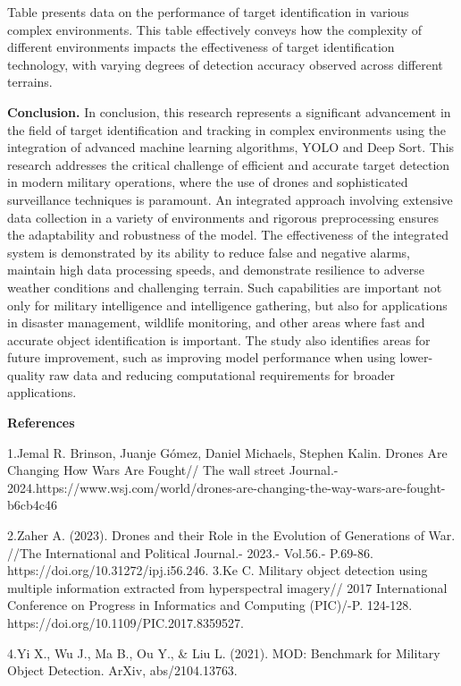Table presents data on the performance of target identification in
various complex environments. This table effectively conveys how the
complexity of different environments impacts the effectiveness of target
identification technology, with varying degrees of detection accuracy
observed across different terrains.

{\bfseries Conclusion.} In conclusion, this research represents a
significant advancement in the field of target identification and
tracking in complex environments using the integration of advanced
machine learning algorithms, YOLO and Deep Sort. This research addresses
the critical challenge of efficient and accurate target detection in
modern military operations, where the use of drones and sophisticated
surveillance techniques is paramount. An integrated approach involving
extensive data collection in a variety of environments and rigorous
preprocessing ensures the adaptability and robustness of the model. The
effectiveness of the integrated system is demonstrated by its ability to
reduce false and negative alarms, maintain high data processing speeds,
and demonstrate resilience to adverse weather conditions and challenging
terrain. Such capabilities are important not only for military
intelligence and intelligence gathering, but also for applications in
disaster management, wildlife monitoring, and other areas where fast and
accurate object identification is important. The study also identifies
areas for future improvement, such as improving model performance when
using lower-quality raw data and reducing computational requirements for
broader applications.

{\bfseries References}

1.Jemal R. Brinson, Juanje Gómez, Daniel Michaels, Stephen Kalin. Drones
Are Changing How Wars Are Fought// The wall street Journal.-
2024.https://www.wsj.com/world/drones-are-changing-the-way-wars-are-fought-b6cb4c46

2.Zaher A. (2023). Drones and their Role in the Evolution of Generations
of War. //The International and Political Journal.- 2023.- Vol.56.-
P.69-86. https://doi.org/10.31272/ipj.i56.246. 3.Ke C. Military object
detection using multiple information extracted from hyperspectral
imagery// 2017 International Conference on Progress in Informatics and
Computing (PIC)/-P. 124-128. https://doi.org/10.1109/PIC.2017.8359527.

4.Yi X., Wu J., Ma B., Ou Y., \& Liu L. (2021). MOD: Benchmark for
Military Object Detection. ArXiv, abs/2104.13763.

